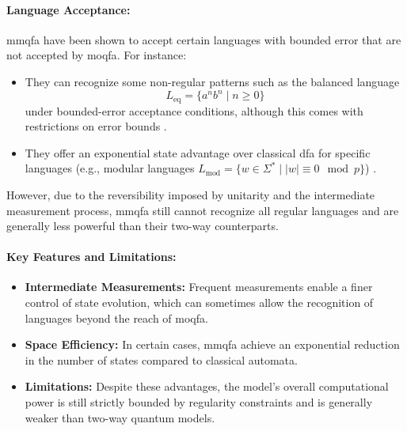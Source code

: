 \paragraph{Language Acceptance:}  
\gls{mmqfa} have been shown to accept certain languages with bounded error that are not accepted by \gls{moqfa}. For instance:
\begin{itemize}
    \item They can recognize some non-regular patterns such as the balanced language 
    \[
    L_{\text{eq}} = \{a^n b^n \mid n \geq 0\}
    \]
    under bounded-error acceptance conditions, although this comes with restrictions on error bounds \cite{kondacs1997power}.
    \item They offer an exponential state advantage over classical \gls{dfa} for specific languages (e.g., modular languages \( L_{\text{mod}} = \{w \in \Sigma^* \mid |w| \equiv 0 \mod p\} \)) \cite{ambainis2009superiority}.
\end{itemize}
However, due to the reversibility imposed by unitarity and the intermediate measurement process, \gls{mmqfa} still cannot recognize all regular languages and are generally less powerful than their two-way counterparts.

\paragraph{Key Features and Limitations:}
\begin{itemize}
    \item \textbf{Intermediate Measurements:} Frequent measurements enable a finer control of state evolution, which can sometimes allow the recognition of languages beyond the reach of \gls{moqfa}.
    \item \textbf{Space Efficiency:} In certain cases, \gls{mmqfa} achieve an exponential reduction in the number of states compared to classical automata.
    \item \textbf{Limitations:} Despite these advantages, the model’s overall computational power is still strictly bounded by regularity constraints and is generally weaker than two-way quantum models.
\end{itemize}

